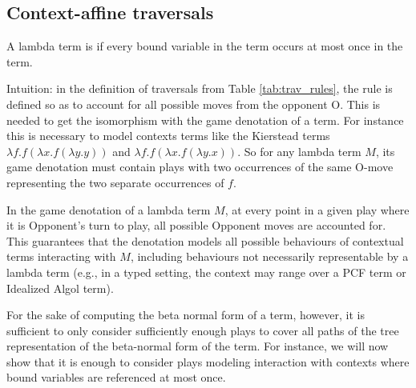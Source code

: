 \documentclass{article}
\theoremstyle{definition}
\begin{document}

\subsection{Context-affine traversals}

A lambda term is  if every bound variable in the term occurs at most once in the term.

Intuition: in the definition of traversals from Table \ref{tab:trav_rules}, the rule  is defined so as to account for all possible moves from the opponent O. This is needed to get the isomorphism with the game denotation of a term. For instance this is necessary to model contexts terms like the Kierstead terms $\lambda f.f(\lambda x.f(\lambda y.y))$ and $\lambda f.f(\lambda x.f(\lambda y.x))$. So for any lambda term $M$, its game denotation must contain plays with two occurrences of the same O-move representing the two separate occurrences of $f$.

In the game denotation of a lambda term $M$, at every point in a given play where it is Opponent's turn to play, all possible Opponent moves are accounted for. This guarantees that the denotation models all possible behaviours of contextual terms interacting with $M$, including behaviours not necessarily representable by a lambda term (e.g., in a typed setting, the context may range over a PCF term or Idealized Algol term).

For the sake of computing the beta normal form of a term, however, it is sufficient to only consider sufficiently enough plays to cover all paths of the tree representation of the beta-normal form of the term. For instance, we will now show that it is enough to consider plays modeling interaction with contexts where bound variables are referenced at most once.
\end{document}
